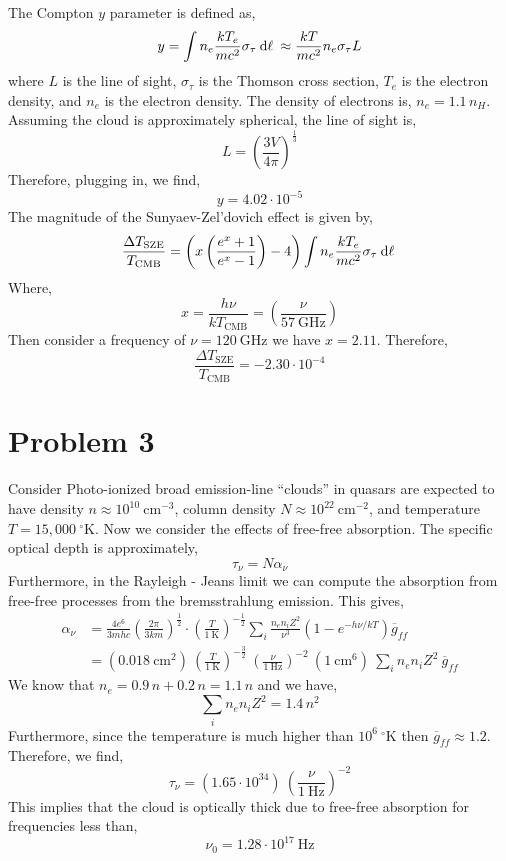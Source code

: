 \documentclass[12pt]{article}
\begin{document}
The Compton $y$ parameter is defined as,
\[ y = \int n_e \frac{k T_e}{m c^2} \sigma_\tau \: \mathrm{d}\ell \: \approx \frac{k T}{m c^2} n_e \sigma_\tau L  \]
where $L$ is the line of sight, $\sigma_\tau$ is the Thomson cross section, $T_e$ is the electron density, and $n_e$ is the electron density. The density of electrons is, $n_e = 1.1 \, n_H$. Assuming the cloud is approximately spherical, the line of sight is,
\[ L = \left( \frac{3 V}{4 \pi} \right)^{\frac{1}{3}} \] 
Therefore, plugging in, we find,
\[ y = 4.02 \cdot 10^{-5} \]
The magnitude of the Sunyaev-Zel’dovich effect is given by,
\[ \frac{\Delta T_{\text{SZE}}}{T_{\text{CMB}}} = \left( x \left( \frac{e^x + 1}{e^x - 1} \right) - 4 \right) \int n_e \frac{k T_e}{m c^2} \sigma_\tau \: \mathrm{d}\ell \: \]
Where,
\[ x = \frac{h \nu}{k T_{\text{CMB}}} = \left( \frac{\nu}{57 \: \mathrm{GHz}} \right) \]
Then consider a frequency of $\nu = 120 \: \mathrm{GHz}$ we have $x = 2.11$. Therefore,
\[ \frac{\Delta T_{\text{SZE}}}{T_{\text{CMB}}} = -2.30 \cdot 10^{-4} \]


\section{Problem 3}

Consider Photo-ionized broad emission-line ``clouds'' in quasars are expected to have density $n \approx 10^{10} \: \mathrm{cm}^{-3}$, column density $N \approx 10^{22} \: \mathrm{cm}^{-2}$, and temperature $T = 15,000 \: ^\circ \mathrm{K}$. Now we consider the effects of free-free absorption. The specific optical depth is approximately,
\[ \tau_\nu = N \alpha_\nu \] 
Furthermore, in the Rayleigh - Jeans limit we can compute the absorption from free-free processes from the bremsstrahlung emission. This gives,
\begin{align*}
\alpha_\nu & = \frac{4 e^6}{3 m h c} \left( \frac{2 \pi}{3 k m} \right)^{\frac{1}{2}} \cdot \left( \frac{T}{1 \: \mathrm{K}} \right)^{- \frac{1}{2}} \sum_i \frac{n_e n_i Z^2}{\nu^3} \left( 1 - e^{-h \nu / k T} \right) \overline{g}_{ff}
\\
& = (0.018 \: \mathrm{cm}^2 ) \: \left( \frac{T}{1 \: \mathrm{K}} \right)^{- \frac{3}{2}} \: \left( \frac{\nu}{1 \: \mathrm{Hz}} \right)^{-2} \: (1 \: \mathrm{cm}^6) \: \sum_i n_e n_i Z^2 \: \overline{g}_{ff}  
\end{align*}
We know that $n_e = 0.9 \, n + 0.2 \, n = 1.1 \, n$ and we have,
\[ \sum_i n_e n_i Z^2 = 1.4 \, n^2 \]
Furthermore, since the temperature is much higher than $10^6 \: ^\circ \mathrm{K}$ then $\overline{g}_{ff} \approx 1.2$. Therefore, we find,
\[ \tau_\nu = (1.65 \cdot 10^{34}) \: \left( \frac{\nu}{1 \: \mathrm{Hz}} \right)^{-2} \]
This implies that the cloud is optically thick due to free-free absorption for frequencies less than,
\[ \nu_0 = 1.28 \cdot 10^{17} \: \mathrm{Hz}  \]
\end{document}
